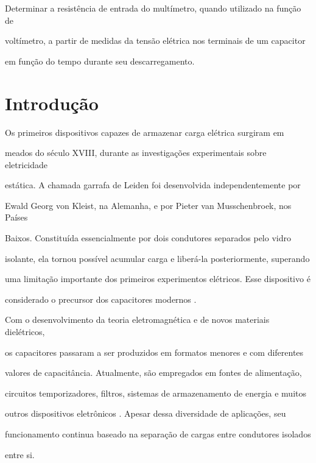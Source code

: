 \documentclass[a4paper,12pt]{article}
\begin{document}
Determinar a resistência de entrada do multímetro, quando utilizado na função de

voltímetro, a partir de medidas da tensão elétrica nos terminais de um capacitor

em função do tempo durante seu descarregamento.




\section{Introdução}

Os primeiros dispositivos capazes de armazenar carga elétrica surgiram em

meados do século XVIII, durante as investigações experimentais sobre eletricidade

estática. A chamada garrafa de Leiden foi desenvolvida independentemente por

Ewald Georg von Kleist, na Alemanha, e por Pieter van Musschenbroek, nos Países

Baixos. Constituída essencialmente por dois condutores separados pelo vidro

isolante, ela tornou possível acumular carga e liberá-la posteriormente, superando

uma limitação importante dos primeiros experimentos elétricos. Esse dispositivo é

considerado o precursor dos capacitores modernos
\parencite{heilbron2022,smithsonian_leyden}.

Com o desenvolvimento da teoria eletromagnética e de novos materiais dielétricos,

os capacitores passaram a ser produzidos em formatos menores e com diferentes

valores de capacitância. Atualmente, são empregados em fontes de alimentação,

circuitos temporizadores, filtros, sistemas de armazenamento de energia e muitos

outros dispositivos eletrônicos \parencite{ling2016}. Apesar dessa diversidade
de aplicações, seu

funcionamento continua baseado na separação de cargas entre condutores isolados

entre si.
\end{document}
